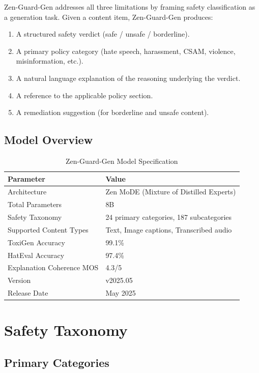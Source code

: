\documentclass[11pt,a4paper]{article}
\begin{document}
Zen-Guard-Gen addresses all three limitations by framing safety classification as a generation task. Given a content item, Zen-Guard-Gen produces:

\begin{enumerate}
  \item A structured safety verdict (safe / unsafe / borderline).
  \item A primary policy category (hate speech, harassment, CSAM, violence, misinformation, etc.).
  \item A natural language explanation of the reasoning underlying the verdict.
  \item A reference to the applicable policy section.
  \item A remediation suggestion (for borderline and unsafe content).
\end{enumerate}

\subsection{Model Overview}

\begin{table}[H]
\centering
\caption{Zen-Guard-Gen Model Specification}
\begin{tabular}{ll}
\toprule
\textbf{Parameter} & \textbf{Value} \\
\midrule
Architecture & Zen MoDE (Mixture of Distilled Experts) \\
Total Parameters & 8B \\
Safety Taxonomy & 24 primary categories, 187 subcategories \\
Supported Content Types & Text, Image captions, Transcribed audio \\
ToxiGen Accuracy & 99.1\% \\
HatEval Accuracy & 97.4\% \\
Explanation Coherence MOS & 4.3/5 \\
Version & v2025.05 \\
Release Date & May 2025 \\
\bottomrule
\end{tabular}
\end{table}

\section{Safety Taxonomy}

\subsection{Primary Categories}
\end{document}
